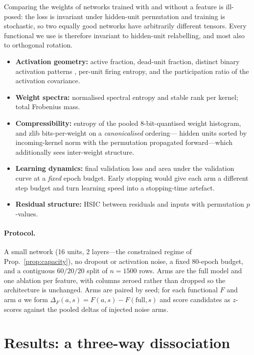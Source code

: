 Comparing the weights of networks trained with and without a feature is
ill-posed: the loss is invariant under hidden-unit permutation and training is
stochastic, so two equally good networks have arbitrarily different tensors.
Every functional we use is therefore invariant to hidden-unit relabelling, and
most also to orthogonal rotation.

\begin{itemize}\itemsep2pt
\item \textbf{Activation geometry:} active fraction, dead-unit fraction,
  distinct binary activation patterns \citep{hanin2019complexity}, per-unit
  firing entropy, and the participation ratio of the activation covariance.
\item \textbf{Weight spectra:} normalised spectral entropy and stable rank per
  kernel; total Frobenius mass.
\item \textbf{Compressibility:} entropy of the pooled 8-bit-quantised weight
  histogram, and zlib bits-per-weight on a \emph{canonicalised} ordering---%
  hidden units sorted by incoming-kernel norm with the permutation propagated
  forward---which additionally sees inter-weight structure.
\item \textbf{Learning dynamics:} final validation loss and area under the
  validation curve at a \emph{fixed} epoch budget. Early stopping would give
  each arm a different step budget and turn learning speed into a stopping-time
  artefact.
\item \textbf{Residual structure:} HSIC between residuals and inputs with
  permutation $p$-values.
\end{itemize}

\paragraph{Protocol.} A small network (16 units, 2 layers---the constrained
regime of Prop.~\ref{prop:capacity}), no dropout or activation noise, a fixed
80-epoch budget, and a contiguous $60/20/20$ split of $n=1500$ rows. Arms are
the full model and one ablation per feature, with columns zeroed rather than
dropped so the architecture is unchanged. Arms are paired by seed; for each
functional $F$ and arm $a$ we form $\Delta_F(a,s) = F(a,s) - F(\text{full},s)$
and score candidates as $z$-scores against the pooled deltas of injected
noise arms.

\section{Results: a three-way dissociation}\label{sec:results}

